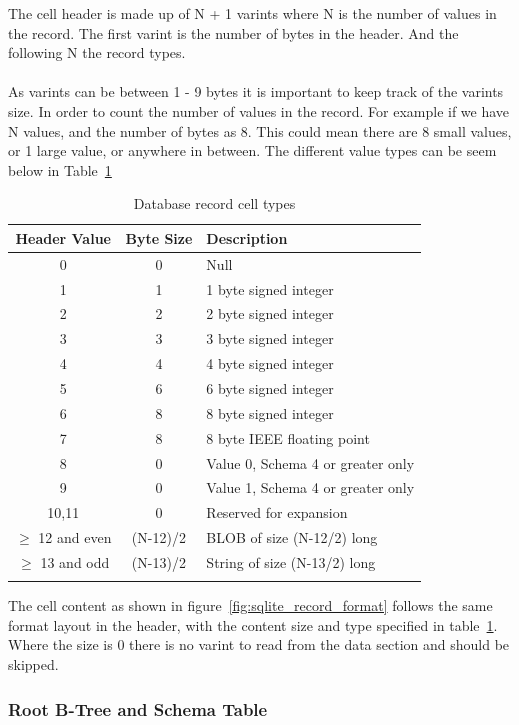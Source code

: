 The cell header is made up of N + 1 varints where N is the number of values in the record. The first varint is the number of bytes in the header. And the following N the record types.
\\\\
As varints can be between 1 - 9 bytes it is important to keep track of the varints size. In order to count the number of values in the record. For example if we have N values, and the number of bytes as 8. This could mean there are 8 small values, or 1 large value, or anywhere in between. The different value types can be seem below in Table~\ref{tbl:cell_header_record_types} 

\begin{longtable}[h]{| c | c| p{5cm} |}
		\hline
			\textbf{Header Value} & \textbf{Byte Size} & \textbf{Description} \\ 
		\hline
		\endhead
			0 & 0 & Null \\
		\hline
			1 & 1 & 1 byte signed integer \\
		\hline
			2 & 2 & 2 byte signed integer \\
		\hline
			3 & 3 & 3 byte signed integer \\
		\hline
			4 & 4 & 4 byte signed integer \\
		\hline
			5 & 6 & 6 byte signed integer \\
		\hline
			6 & 8 & 8 byte signed integer \\
		\hline
			7 & 8 & 8 byte IEEE floating point \\
		\hline
			8 & 0 & Value 0, Schema 4 or greater only \\
		\hline
			9 & 0 & Value 1, Schema 4 or greater only \\
		\hline
			10,11 & 0 & Reserved for expansion \\
		\hline
			$\geq$ 12 and even & (N-12)/2 & BLOB of size (N-12/2) long \\
		\hline
			$\geq$ 13 and odd & (N-13)/2 & String of size (N-13/2) long \\
		\hline
	\caption{Database record cell types}
	\label{tbl:cell_header_record_types}
\end{longtable}

The cell content as shown in figure~\ref{fig:sqlite_record_format} follows the same format layout in the header, with the content size and type specified in table~\ref{tbl:cell_header_record_types}. Where the size is 0 there is no varint to read from the data section and should be skipped.

\subsubsection{Root B-Tree and Schema Table}
\label{subsubsec:schema_table}

